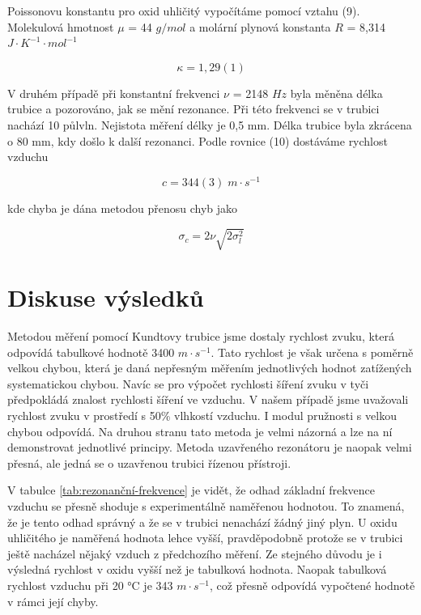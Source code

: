 Poissonovu konstantu pro oxid uhličitý vypočítáme pomocí vztahu (9). Molekulová hmotnost \(\mu\) = 44 \(g/mol\) a molární plynová konstanta \(R\) = 8,314 \(J \cdot K^{-1} \cdot mol^{-1}\)

\begin{equation}
    \nonumber
    \kappa = 1,29(1)
\end{equation}

V druhém případě při konstantní frekvenci \(\nu\) = 2148 \(Hz\) byla měněna délka trubice a pozorováno, jak se mění rezonance. Při této frekvenci se v trubici nachází 10 půlvln. Nejistota měření délky je 0,5 mm. Délka trubice byla zkrácena o 80 mm, kdy došlo k další rezonanci. Podle rovnice (10) dostáváme rychlost vzduchu

\begin{equation}
    \nonumber
    c = 344(3) \; m \cdot s^{-1}
\end{equation}

kde chyba je dána metodou přenosu chyb jako

\begin{equation}
    \sigma_c = 2\nu \sqrt{2\sigma^2_l}
\end{equation}

\section{Diskuse výsledků}

Metodou měření pomocí Kundtovy trubice jsme dostaly rychlost zvuku, která odpovídá tabulkové hodnotě 3400 \(m \cdot s^{-1}\). Tato rychlost je však určena s poměrně velkou chybou, která je daná nepřesným měřením jednotlivých hodnot zatížených systematickou chybou. Navíc se pro výpočet rychlosti šíření zvuku v tyči předpokládá znalost rychlosti šíření ve vzduchu. V našem případě jsme uvažovali rychlost zvuku v prostředí s 50\% vlhkostí vzduchu. I modul pružnosti s velkou chybou odpovídá. Na druhou stranu tato metoda je velmi názorná a lze na ní demonstrovat jednotlivé principy. Metoda uzavřeného rezonátoru je naopak velmi přesná, ale jedná se o uzavřenou trubici řízenou přístroji.

V tabulce \ref{tab:rezonanční-frekvence} je vidět, že odhad základní frekvence vzduchu se přesně shoduje s experimentálně naměřenou hodnotou. To znamená, že je tento odhad správný a že se v trubici nenachází žádný jiný plyn. U oxidu uhličitého je naměřená hodnota lehce vyšší, pravděpodobně protože se v trubici ještě nacházel nějaký vzduch z předchozího měření. Ze stejného důvodu je i výsledná rychlost v oxidu vyšší než je tabulková hodnota. Naopak tabulková rychlost vzduchu při 20 °C je 343 \(m \cdot s^{-1}\), což přesně odpovídá vypočtené hodnotě v rámci její chyby.


